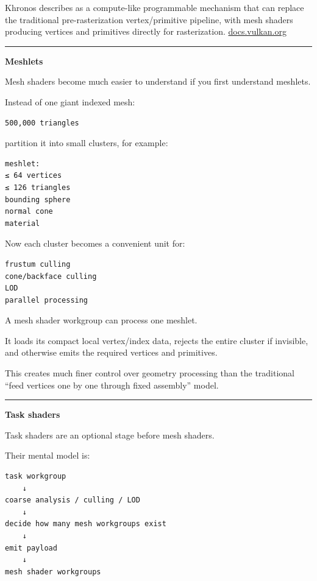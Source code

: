 Khronos describes  as a compute-like programmable mechanism that can replace the traditional pre-rasterization vertex/primitive pipeline, with mesh shaders producing vertices and primitives directly for rasterization. \href{https://docs.vulkan.org/features/latest/features/proposals/VK_EXT_mesh_shader.html?utm_source=chatgpt.com}{docs.vulkan.org}

\begin{center}\rule{0.5\linewidth}{0.5pt}\end{center}

\textbf{Meshlets}

Mesh shaders become much easier to understand if you first understand meshlets.

Instead of one giant indexed mesh:

\begin{verbatim}
500,000 triangles
\end{verbatim}

partition it into small clusters, for example:

\begin{verbatim}
meshlet:
≤ 64 vertices
≤ 126 triangles
bounding sphere
normal cone
material
\end{verbatim}

Now each cluster becomes a convenient unit for:

\begin{verbatim}
frustum culling
cone/backface culling
LOD
parallel processing
\end{verbatim}

A mesh shader workgroup can process one meshlet.

It loads its compact local vertex/index data, rejects the entire cluster if invisible, and otherwise emits the required vertices and primitives.

This creates much finer control over geometry processing than the traditional ``feed vertices one by one through fixed assembly'' model.

\begin{center}\rule{0.5\linewidth}{0.5pt}\end{center}

\textbf{Task shaders}

Task shaders are an optional stage before mesh shaders.

Their mental model is:

\begin{verbatim}
task workgroup
    ↓
coarse analysis / culling / LOD
    ↓
decide how many mesh workgroups exist
    ↓
emit payload
    ↓
mesh shader workgroups
\end{verbatim}

